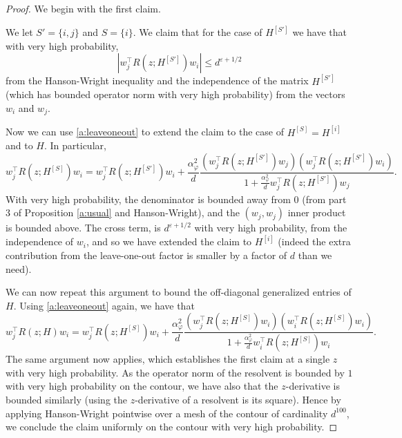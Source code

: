 \documentclass[letterpaper, 10pt, dvipsnames]{article}
\numberwithin{equation}{section}
\renewcommand{\epsilon}{\varepsilon}
\renewcommand{\phi}{\varphi}
\theoremstyle{definition}
\begin{document}
\begin{proof}
  We begin with the first claim.
  
  We let $S' = \{i,j\}$ and $S = \{i\}$.  We claim that for the case of $H^{[S']}$ we have that with very high probability,
  \[
  |w_j^{\top} R(z; H^{[S']})w_i| \leq d^{\epsilon+1/2}
  \]
  from the Hanson-Wright inequality and the independence of the matrix $H^{[S']}$ (which has bounded operator norm with very high probability) from the vectors $w_i$ and $w_j$.  

  Now we can use \eqref{a:leaveoneout} to extend the claim to the case of $H^{[S]}=H^{[i]}$ and to $H$. In particular, 
  \[
    w_j^{\top} R(z; H^{[S]})w_i = w_j^{\top} R(z; H^{[S']})w_i + \frac{\alpha_\phi^2}{d}\frac{\left(w_j^{\top} R(z; H^{[S']})w_j\right)\left(w_j^{\top} R(z; H^{[S']})w_i\right)}{1+\frac{\alpha_\phi^2}{d}w_j^{\top} R(z; H^{[S']})w_j}.
  \]
  With very high probability, the denominator is bounded away from $0$ (from part 3 of Proposition \ref{a:usual} and Hanson-Wright), and the $(w_j,w_j)$ inner product is bounded above.  The cross term, is $d^{\epsilon+1/2}$ with very high probability, from the independence of $w_i$, and so we have extended the claim to $H^{[i]}$ (indeed the extra contribution from the leave-one-out factor is smaller by a factor of $d$ than we need).  

  We can now repeat this argument to bound the off-diagonal generalized entries of $H$.  Using \eqref{a:leaveoneout} again, we have that
  \[
  w_j^{\top} R(z; H)w_i = w_j^{\top} R(z; H^{[S]})w_i + \frac{\alpha_\phi^2}{d}\frac{\left(w_j^{\top} R(z; H^{[S]})w_i\right)\left(w_i^{\top} R(z; H^{[S]})w_i\right)}{1+\frac{\alpha_\phi^2}{d}w_i^{\top} R(z; H^{[S]})w_i}.
  \]
  The same argument now applies, which establishes the first claim at a single $z$ with very high probability.  As the operator norm of the resolvent is bounded by $1$ with very high probability on the contour, we have also that the $z$-derivative is bounded similarly (using the $z$-derivative of a resolvent is its square).  Hence by applying Hanson-Wright pointwise over a mesh of the contour of cardinality $d^{100}$, we conclude the claim uniformly on the contour with very high probability.




\end{proof}
\end{document}
